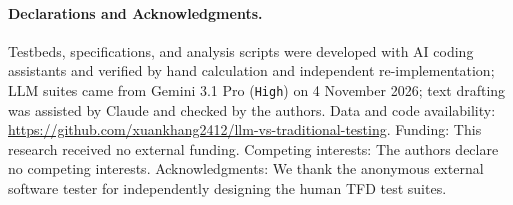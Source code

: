 \documentclass[acmsmall]{acmart}
\begin{document}
\paragraph{Declarations and Acknowledgments.}
Testbeds, specifications, and analysis scripts were developed with AI coding assistants and verified by hand calculation and independent re-implementation; LLM suites came from Gemini 3.1 Pro (\texttt{High}) on 4 November 2026; text drafting was assisted by Claude and checked by the authors. Data and code availability: \url{https://github.com/xuankhang2412/llm-vs-traditional-testing}. Funding: This research received no external funding. Competing interests: The authors declare no competing interests. Acknowledgments: We thank the anonymous external software tester for independently designing the human TFD test suites.



\end{document}
